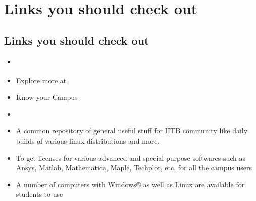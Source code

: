 \documentclass[openany]{book} %
\begin{document}
\bigbreak
\bigbreak
{}
\chapter{Links you should check out}
\section{Links you should check out}
\begin{itemize}
	\item \href{https://www.ee.iitb.ac.in}{\color{blue}{Department Website}}
	\item Explore more at \href{http://www.iitb.ac.in/en/activities/student-clubs}{\color{blue}{Clubs at IITB}}
	\item \href{https://insti.app/feed}{\color{blue}{Insti App}} Know your Campus
	\item \href{https://gymkhana.iitb.ac.in/~scp/scp/index.html}{\color{blue}{Institute Students Companion Program (ISCP)}}
	\item \href{http://ftp.iitb.ac.in/}{\color{blue}{IIT Bombay FTP Server}} A common repository of  general useful stuff for IITB community like daily builds of various linux distributions and more.
	\item \href{https://www.cc.iitb.ac.in/}{\color{blue}{Computer Center}} To get licenses for various advanced and special purpose softwares such as Ansys, Matlab, Mathematica, Maple, Techplot, etc. for all the campus users
	\item \href{http://www.ee.iitb.ac.in/~pclab/index.php/}{\color{blue}{PC Lab}} A number of computers with Windows® as well as Linux are available for students to use
	
\end{itemize}


\end{document}
